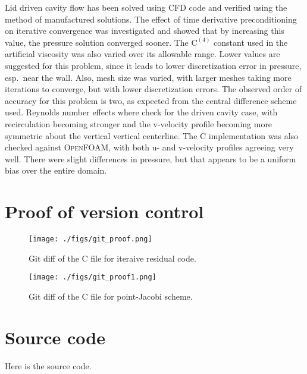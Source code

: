 \documentclass[10pt, letterpaper]{article}
\begin{document}
Lid driven cavity flow has been solved using CFD code and verified using
the method of manufactured solutions.  The effect of time derivative 
preconditioning on iterative convergence was investigated and showed that
by increasing this value, the pressure solution converged sooner.  The 
$\mathrm{C^{(4)}}$ constant used in the artificial viscosity was also varied
over its allowable range.  Lower values are suggested for this problem, since
it leads to lower discretization error in pressure, esp.\ near the wall.  Also,
mesh size was varied, with larger meshes taking more iterations to converge,
but with lower discretization errors.  The observed order of accuracy for this problem
is two, as expected from the central difference scheme used.  Reynolds number
effects where check for the driven cavity case, with recirculation becoming
stronger and the v-velocity profile becoming more symmetric about the vertical
vertical centerline.  The C implementation was also checked against
\textsc{OpenFOAM}, with both u- and v-velocity profiles agreeing very well.  There
were slight differences in pressure, but that appears to be a uniform bias
over the entire domain.






\newpage

\section{Proof of version control}

\begin{figure}[h]
	\centering
	\texttt{[image: ./figs/git\_proof.png]}
	\caption{Git diff of the C file for iteraive residual code.}
\end{figure}

\begin{figure}[h!]
	\centering
	\texttt{[image: ./figs/git\_proof1.png]}
	\caption{Git diff of the C file for point-Jacobi scheme.}
\end{figure}

\clearpage

\section{Source code}

Here is the source code.


\end{document}
